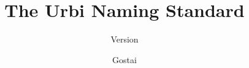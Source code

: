 \documentclass{gostai-report}
\title{The Urbi Naming Standard}
\subtitle{Version \VcsDescription}
\author{Gostai}
\begin{document}
\maketitle
\tableofcontents
\savesections
\raisesections
\let\chapter\section

\restoresections
\chapterIndex
\end{document}
